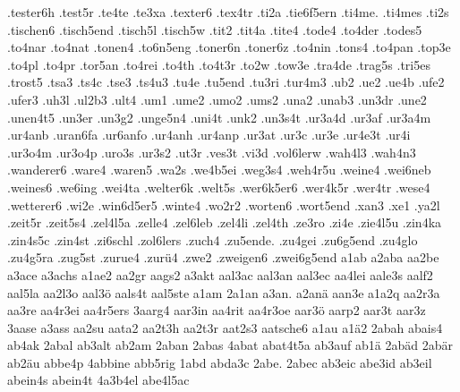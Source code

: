 {    .tester6h
    .test5r
    .te4te
    .te3xa
    .texter6
    .tex4tr
    .ti2a
    .tie6f5ern
    .ti4me.
    .ti4mes
    .ti2s
    .tischen6
    .tisch5end
    .tisch5l
    .tisch5w
    .tit2
    .tit4a
    .tite4
    .tode4
    .to4der
    .todes5
    .to4nar
    .to4nat
    .tonen4
    .to6n5eng
    .toner6n
    .toner6z
    .to4nin
    .tons4
    .to4pan
    .top3e
    .to4pl
    .to4pr
    .tor5an
    .to4rei
    .to4th
    .to4t3r
    .to2w
    .tow3e
    .tra4de
    .trag5s
    .tri5es
    .trost5
    .tsa3
    .ts4c
    .tse3
    .ts4u3
    .tu4e
    .tu5end
    .tu3ri
    .tur4m3
    .ub2
    .ue2
    .ue4b
    .ufe2
    .ufer3
    .uh3l
    .ul2b3
    .ult4
    .um1
    .ume2
    .umo2
    .ums2
    .una2
    .unab3
    .un3dr
    .une2
    .unen4t5
    .un3er
    .un3g2
    .unge5n4
    .uni4t
    .unk2
    .un3s4t
    .ur3a4d
    .ur3af
    .ur3a4m
    .ur4anb
    .uran6fa
    .ur6anfo
    .ur4anh
    .ur4anp
    .ur3at
    .ur3c
    .ur3e
    .ur4e3t
    .ur4i
    .ur3o4m
    .ur3o4p
    .uro3s
    .ur3s2
    .ut3r
    .ves3t
    .vi3d
    .vol6lerw
    .wah4l3
    .wah4n3
    .wanderer6
    .ware4
    .waren5
    .wa2s
    .we4b5ei
    .weg3s4
    .weh4r5u
    .weine4
    .wei6neb
    .weines6
    .we6ing
    .wei4ta
    .welter6k
    .welt5s
    .wer6k5er6
    .wer4k5r
    .wer4tr
    .wese4
    .wetterer6
    .wi2e
    .win6d5er5
    .winte4
    .wo2r2
    .worten6
    .wort5end
    .xan3
    .xe1
    .ya2l
    .zeit5r
    .zeit5s4
    .zel4l5a
    .zelle4
    .zel6leb
    .zel4li
    .zel4th
    .ze3ro
    .zi4e
    .zie4l5u
    .zin4ka
    .zin4s5c
    .zin4st
    .zi6schl
    .zol6lers
    .zuch4
    .zu5ende.
    .zu4gei
    .zu6g5end
    .zu4glo
    .zu4g5ra
    .zug5st
    .zurue4
    .zurü4
    .zwe2
    .zweigen6
    .zwei6g5end
    a1ab
    a2aba
    aa2be
    a3ace
    a3achs
    a1ae2
    aa2gr
    aags2
    a3akt
    aal3ac
    aal3an
    aal3ec
    aa4lei
    aale3s
    aalf2
    aal5la
    aa2l3o
    aal3ö
    aals4t
    aal5ste
    a1am
    2a1an
    a3an.
    a2anä
    aan3e
    a1a2q
    aa2r3a
    aa3re
    aa4r3ei
    aa4r5ers
    3aarg4
    aar3in
    aa4rit
    aa4r3oe
    aar3ö
    aarp2
    aar3t
    aar3z
    3aase
    a3ass
    aa2su
    aata2
    aa2t3h
    aa2t3r
    aat2s3
    aatsche6
    a1au
    a1ä2
    2abah
    abais4
    ab4ak
    2abal
    ab3alt
    ab2am
    2aban
    2abas
    4abat
    abat4t5a
    ab3auf
    ab1ä
    2abäd
    2abär
    ab2äu
    abbe4p
    4abbine
    abb5rig
    1abd
    abda3c
    2abe.
    2abec
    ab3eic
    abe3id
    ab3eil
    abein4s
    abein4t
    4a3b4el
    abe4l5ac
}
